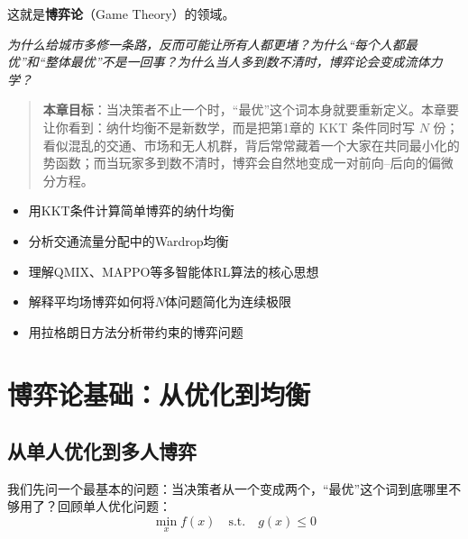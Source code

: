 这就是\textbf{博弈论}（Game Theory）的领域。

\vspace{0.3cm}
\noindent\textit{为什么给城市多修一条路，反而可能让所有人都更堵？为什么“每个人都最优”和“整体最优”不是一回事？为什么当人多到数不清时，博弈论会变成流体力学？}

\begin{quote}
\textbf{本章目标}：当决策者不止一个时，“最优”这个词本身就要重新定义。本章要让你看到：纳什均衡不是新数学，而是把第1章的 KKT 条件同时写 $N$ 份；看似混乱的交通、市场和无人机群，背后常常藏着一个大家在共同最小化的势函数；而当玩家多到数不清时，博弈会自然地变成一对前向--后向的偏微分方程。
\end{quote}

\begin{tcolorbox}[colback=green!5, colframe=green!60!black, title=学完这章，你将能够...]
\begin{itemize}
    \item 用KKT条件计算简单博弈的纳什均衡
    \item 分析交通流量分配中的Wardrop均衡
    \item 理解QMIX、MAPPO等多智能体RL算法的核心思想
    \item 解释平均场博弈如何将$N$体问题简化为连续极限
    \item 用拉格朗日方法分析带约束的博弈问题
\end{itemize}
\end{tcolorbox}

\section{博弈论基础：从优化到均衡}

\subsection{从单人优化到多人博弈}

我们先问一个最基本的问题：当决策者从一个变成两个，“最优”这个词到底哪里不够用了？回顾单人优化问题：
\begin{equation}
    \min_{x} f(x) \quad \text{s.t.} \quad g(x) \leq 0
\end{equation}

